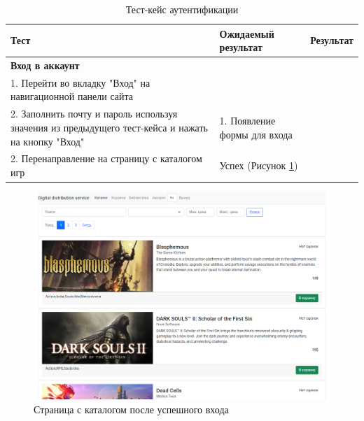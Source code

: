 \begin{table}[!htb]
	\caption{Тест-кейс аутентификации}
	\label{table:testing:func:test2}
	\centering
	  \begin{tabular}{| >{\raggedright}m{} 
					  | >{\raggedright}m{} 
					  | >{\raggedright\arraybackslash}m{}|}
	  \hline Тест & Ожидаемый результат  & Результат \\
	  \hline \textbf{Вход в аккаунт} \\ 1. Перейти во вкладку "Вход" на навигационной панели сайта \\ 2. Заполнить почту и пароль используя значения из предыдущего тест-кейса и нажать на кнопку "Вход" & 1. Появление формы для входа \\ 2. Перенаправление на страницу с каталогом игр & Успех (Рисунок \ref*{sec:testing:func:login})\\
	  \hline
	  \end{tabular}
\end{table}

\begin{figure}[!htb]
	\centering
	  \includegraphics[scale=0.4]{attachments/login.png}  
	  \caption{ Страница с каталогом после успешного входа }
	  \label{sec:testing:func:login}
\end{figure}


